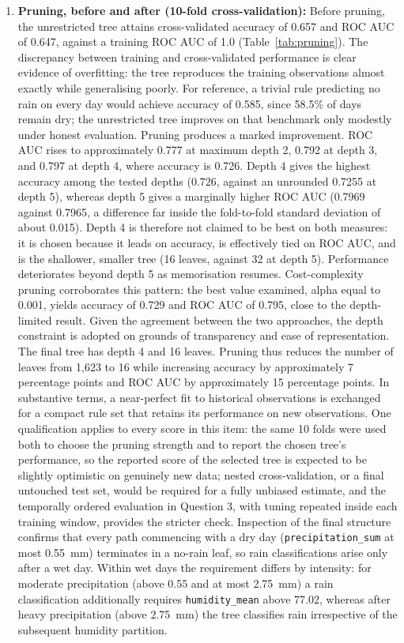 \documentclass[conference]{IEEEtran}
\begin{document}
\begin{enumerate}
    \item \textbf{Pruning, before and after (10-fold cross-validation):} Before pruning, the unrestricted tree attains cross-validated accuracy of 0.657 and ROC AUC of 0.647, against a training ROC AUC of 1.0 (Table~\ref{tab:pruning}). The discrepancy between training and cross-validated performance is clear evidence of overfitting: the tree reproduces the training observations almost exactly while generalising poorly. For reference, a trivial rule predicting no rain on every day would achieve accuracy of 0.585, since 58.5\% of days remain dry; the unrestricted tree improves on that benchmark only modestly under honest evaluation. Pruning produces a marked improvement. ROC AUC rises to approximately 0.777 at maximum depth 2, 0.792 at depth 3, and 0.797 at depth 4, where accuracy is 0.726. Depth 4 gives the highest accuracy among the tested depths (0.726, against an unrounded 0.7255 at depth 5), whereas depth 5 gives a marginally higher ROC AUC (0.7969 against 0.7965, a difference far inside the fold-to-fold standard deviation of about 0.015). Depth 4 is therefore not claimed to be best on both measures: it is chosen because it leads on accuracy, is effectively tied on ROC AUC, and is the shallower, smaller tree (16 leaves, against 32 at depth 5). Performance deteriorates beyond depth 5 as memorisation resumes. Cost-complexity pruning corroborates this pattern: the best value examined, alpha equal to 0.001, yields accuracy of 0.729 and ROC AUC of 0.795, close to the depth-limited result. Given the agreement between the two approaches, the depth constraint is adopted on grounds of transparency and ease of representation. The final tree has depth 4 and 16 leaves. Pruning thus reduces the number of leaves from 1{,}623 to 16 while increasing accuracy by approximately 7 percentage points and ROC AUC by approximately 15 percentage points. In substantive terms, a near-perfect fit to historical observations is exchanged for a compact rule set that retains its performance on new observations. One qualification applies to every score in this item: the same 10 folds were used both to choose the pruning strength and to report the chosen tree's performance, so the reported score of the selected tree is expected to be slightly optimistic on genuinely new data; nested cross-validation, or a final untouched test set, would be required for a fully unbiased estimate, and the temporally ordered evaluation in Question 3, with tuning repeated inside each training window, provides the stricter check. Inspection of the final structure confirms that every path commencing with a dry day (\texttt{precipitation\_sum} at most 0.55~mm) terminates in a no-rain leaf, so rain classifications arise only after a wet day. Within wet days the requirement differs by intensity: for moderate precipitation (above 0.55 and at most 2.75~mm) a rain classification additionally requires \texttt{humidity\_mean} above 77.02, whereas after heavy precipitation (above 2.75~mm) the tree classifies rain irrespective of the subsequent humidity partition.


\end{enumerate}
\end{document}
